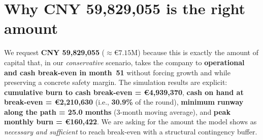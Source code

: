 \documentclass[11pt, a4paper, oneside]{article}
\begin{document}
\begin{table}[H]
\centering
\caption{Financial Projection Summary (Year-End)}
\label{tab:financial_summary}
\end{table}

\begin{table}[H]
\centering
\caption{Key Financial Metrics}
\label{tab:financial_metrics}
\end{table}

\newpage
\section{Why CNY 59{,}829{,}055 is the right amount}

We request \textbf{CNY 59{,}829{,}055} ($\approx€7.15\text{M}$) because this is exactly the amount of capital that, in our \emph{conservative} scenario, takes the company to \textbf{operational and cash break-even in month~51} without forcing growth and while preserving a concrete safety margin. The simulation results are explicit: \textbf{cumulative burn to cash break-even = €4{,}939{,}370}, \textbf{cash on hand at break-even = €2{,}210{,}630} (i.e., \textbf{30.9\%} of the round), \textbf{minimum runway along the path = 25.0 months} (3-month moving average), and \textbf{peak monthly burn = €160{,}422}. We are asking for the amount the model shows as \emph{necessary and sufficient} to reach break-even with a structural contingency buffer.
\end{document}
